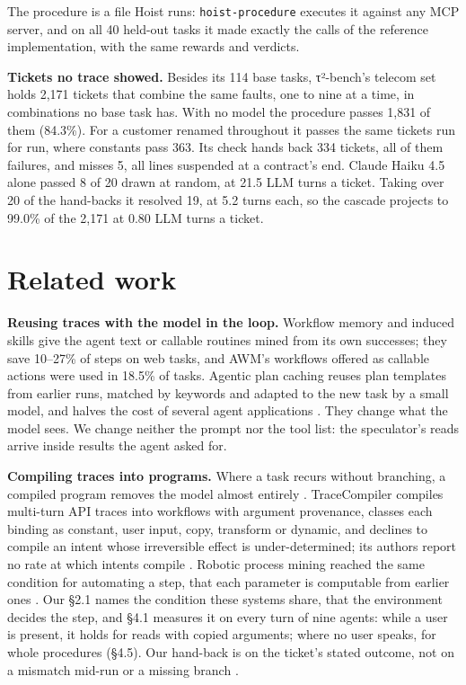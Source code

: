 \documentclass[10pt,twocolumn,letterpaper]{article}
\newcommand{\runin}[1]{{\sffamily\bfseries\color{accent}#1}}
\begin{document}
The procedure is a file Hoist runs: \texttt{hoist-procedure} executes it against any MCP server, and on all 40 held-out tasks it made exactly the calls of the reference implementation, with the same rewards and verdicts.

\runin{Tickets no trace showed.} Besides its 114 base tasks, τ²-bench's telecom set holds 2,171 tickets that combine the same faults, one to nine at a time, in combinations no base task has. With no model the procedure passes 1,831 of them (84.3\%). For a customer renamed throughout it passes the same tickets run for run, where constants pass 363. Its check hands back 334 tickets, all of them failures, and misses 5, all lines suspended at a contract's end. Claude Haiku 4.5 alone passed 8 of 20 drawn at random, at 21.5 LLM turns a ticket. Taking over 20 of the hand-backs it resolved 19, at 5.2 turns each, so the cascade projects to 99.0\% of the 2,171 at 0.80 LLM turns a ticket.

\section{Related work}\label{related-work}

\runin{Reusing traces with the model in the loop.} Workflow memory \citep{wang2025awm} and induced skills \citep{wang2025asi, prabhu2025walt, zheng2025skillweaver} give the agent text or callable routines mined from its own successes; they save 10--27\% of steps on web tasks, and AWM's workflows offered as callable actions were used in 18.5\% of tasks. Agentic plan caching reuses plan templates from earlier runs, matched by keywords and adapted to the new task by a small model, and halves the cost of several agent applications \citep{zhang2025apc}. They change what the model sees. We change neither the prompt nor the tool list: the speculator's reads arrive inside results the agent asked for.

\runin{Compiling traces into programs.} Where a task recurs without branching, a compiled program removes the model almost entirely \citep{wang2026loop, trooskens2026compiledai, li2026preact}. TraceCompiler compiles multi-turn API traces into workflows with argument provenance, classes each binding as constant, user input, copy, transform or dynamic, and declines to compile an intent whose irreversible effect is under-determined; its authors report no rate at which intents compile \citep{elyadouni2026tracecompiler}. Robotic process mining reached the same condition for automating a step, that each parameter is computable from earlier ones \citep{bosco2019routines, leno2021routines}. Our §2.1 names the condition these systems share, that the environment decides the step, and §4.1 measures it on every turn of nine agents: while a user is present, it holds for reads with copied arguments; where no user speaks, for whole procedures (§4.5). Our hand-back is on the ticket's stated outcome, not on a mismatch mid-run \citep{li2026preact} or a missing branch \citep{elyadouni2026tracecompiler}.
\end{document}
